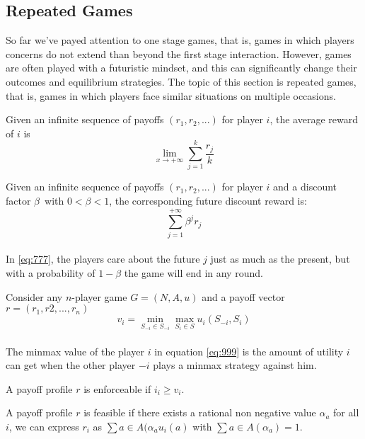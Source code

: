 \subsection{Repeated Games}
So far we've payed attention to one stage games, that  is, games in which players concerns do not extend than beyond the first stage interaction. However, games are often played with a futuristic mindset, and this can significantly change their outcomes and equilibrium strategies. The topic of this section is repeated games, that is, games in which players face similar situations on multiple occasions.
\begin{mydef}\label{def:def666}
Given an infinite sequence of payoffs $(r_1, r_2, ...) $ for player $i$, the average reward of $i$ is
 \begin{equation}
  \lim_{x \to +\infty} \sum_{j=1}^k \frac{r_j}{k}
 \end{equation}	
\end{mydef}
\begin{mydef}\label{def:def777}
Given an infinite sequence of payoffs  $(r_1, r_2, ...) $ for player $i$ and a discount factor $\beta$\ with $ 0 < \beta < 1 $, the corresponding future discount reward is: 
 \begin{equation}\label{eq:777}
 \sum_{j=1}^{+\infty} \beta^j r_j
\end{equation}
\end{mydef}
\paragraph{}In \ref{eq:777}, the players care about the future $j$ just as much as the present, but with a probability of $1 - \beta$ the game will end in any round.
\begin{mydef}\label{def:def888}
Consider any $n$-player game $G = (N,A,u)$ and a payoff vector $r = (r_1, r2, ..., r_n)$
 \begin{equation}\label{eq:999}
	v_i = \min_{S_{-i} \in S_{-i}} \max_{S_i \in S} u_i (S_{-i}, S_i)
\end{equation}
\end{mydef}
\paragraph{} The minmax value of the player $i$ in equation \ref{eq:999} is the amount of utility $i$ can get when the other player $-i$ plays a minmax strategy against him.
\begin{mydef}[Enforceability]\label{def:def100}
A payoff profile $r$ is enforceable if $i_i \geq v_i$.
\end{mydef}
\begin{mydef}[Feasibility]\label{def:def100}
A payoff profile $r$ is feasible if there exists a rational non negative value $\alpha_a$ for all $i$, we can express $r_i$ as $\sum{a \in A}(\alpha_a u_i(a)$ with $\sum{a \in A}(\alpha_a) = 1$.
\end{mydef}
